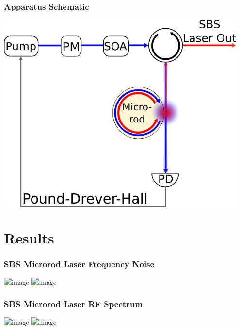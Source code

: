 \documentclass{beamer}
\begin{document}
\begin{frame}\frametitle{Apparatus Schematic}
\includegraphics[width=0.95\textwidth]{Images/SBS_Microrod_Schematic.png}
\end{frame}

\section{Results}
\begin{frame}\frametitle{SBS Microrod Laser Frequency Noise}
\includegraphics<1>[width=1.0\textwidth]{Images/Freq_Noise_Comparison_Plot1.png}
\includegraphics<2>[width=1.0\textwidth]{Images/Freq_Noise_Comparison_Plot2.png}
\end{frame}

\begin{frame}\frametitle{SBS Microrod Laser RF Spectrum}
\includegraphics<1>[width=1.0\textwidth]{Images/RF_Spectrum_Plot1.png}
\includegraphics<2>[width=1.0\textwidth]{Images/RF_Spectrum_Plot2.png}
\end{frame}
\end{document}
